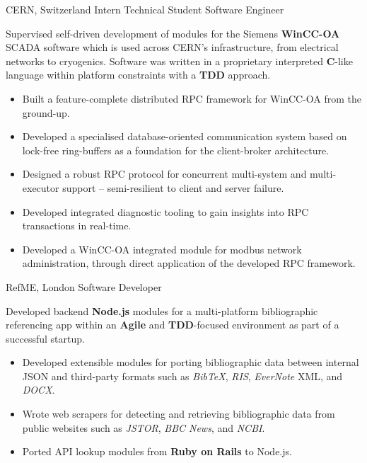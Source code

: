 \documentclass[12pt,a4paper]{article}
\begin{document}
       {CERN, Switzerland}
       {Intern Technical Student Software Engineer}
{%
  Supervised self-driven development of modules for the Siemens {\bfseries WinCC-OA}
  SCADA software which is used across CERN's infrastructure, from
  electrical networks to cryogenics.
  Software was written in a proprietary interpreted {\bfseries C}-like language
  within platform constraints with a {\bfseries TDD} approach.

  \begin{itemize}
    \item Built a feature-complete distributed RPC framework for WinCC-OA
      from the ground-up.

    \item Developed a specialised database-oriented communication system based
      on lock-free ring-buffers as a foundation for the client-broker architecture.

    \item Designed a robust RPC protocol for concurrent multi-system and multi-executor
      support -- semi-resilient to client and server failure.

    \item Developed integrated diagnostic tooling to gain insights into RPC transactions in
      real-time.

    \item Developed a WinCC-OA integrated module for modbus network administration,
      through direct application of the developed RPC framework.
  \end{itemize}
}

       {RefME, London}
       {Software Developer}
{%
  Developed backend {\bfseries Node.js} modules for a multi-platform
  bibliographic referencing app within an {\bfseries Agile} and
  {\bfseries TDD}-focused environment as part of a successful startup.


  \begin{itemize}
    \item Developed extensible modules for porting bibliographic data between
      internal JSON and third-party formats such as
      \emph{BibTeX},
      \emph{RIS},
      \emph{EverNote} XML, and
      \emph{DOCX}.

    \item Wrote web scrapers for detecting and retrieving bibliographic data
      from public websites such as
      \emph{JSTOR},
      \emph{BBC News}, and
      \emph{NCBI}.

    \item Ported API lookup modules from {\bfseries Ruby on Rails} to Node.js.

  \end{itemize}
}
\end{document}
